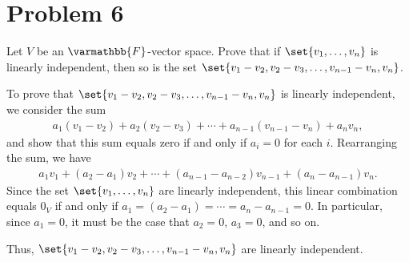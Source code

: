 \documentclass[10pt]{mypackage}
\renewcommand*{\mathbb}[1]{\varmathbb{#1}}
\begin{document}
\section{Problem 6}%
\begin{problem}
  Let $V$ be an $\mathbb{F}$-vector space. Prove that if $\set{v_1,\dots,v_n}$ is linearly independent, then so is the set $\set{v_1-v_2,v_2-v_3,\dots,v_{n-1}-v_{n},v_n}$.
\end{problem}
\begin{solution}
  To prove that $\set{v_1-v_2,v_2-v_3,\dots,v_{n-1}-v_{n},v_n}$ is linearly independent, we consider the sum
  \begin{align*}
    a_1\left(v_1 - v_2\right) + a_2\left(v_2 - v_3\right) + \cdots + a_{n-1}\left(v_{n-1} - v_n\right) + a_nv_n,
  \end{align*}
  and show that this sum equals zero if and only if $a_i = 0$ for each $i$. Rearranging the sum, we have
  \begin{align*}
    a_1v_1 + \left(a_2 - a_1\right)v_2 + \cdots + \left(a_{n-1} - a_{n-2}\right)v_{n-1} + \left(a_{n}-a_{n-1}\right)v_n.
  \end{align*}
  Since the set $\set{v_1,\dots,v_n}$ are linearly independent, this linear combination equals $0_V$ if and only if $a_1 = \left(a_2 - a_1\right) = \cdots = a_{n} - a_{n-1} = 0$. In particular, since $a_1 = 0$, it must be the case that $a_2 = 0$, $a_3 = 0$, and so on.\newline

  Thus, $\set{v_{1} - v_2,v_2 - v_3,\dots,v_{n-1}-v_n,v_n}$ are linearly independent.
\end{solution}
%
\end{document}
